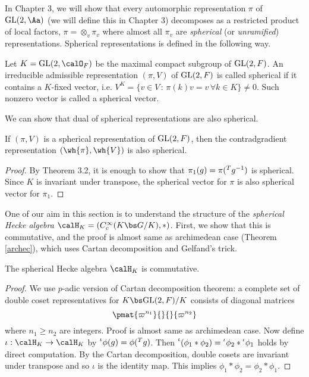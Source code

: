 In Chapter 3, we will show that every automorphic representation $\pi$ of $\GL(2, \Aa)$ (we will define this in Chapter 3) decomposes as a restricted product of local factors, $\pi = \otimes_{v}\pi_v$ where almost all $\pi_v$ are \emph{spherical} (or \emph{unramified}) representations. 
Spherical representations is defined in the following way. 
\begin{definition}
Let $K = \GL(2, \calO_F)$ be the maximal compact subgroup of $\mathrm{GL}(2, F)$. 
An irreducible admissible representation $(\pi, V)$ of $\mathrm{GL}(2, F)$ is called spherical if it contains a $K$-fixed vector, i.e. $V^{K} = \{v\in V\,:\, \pi(k)v = v\,\forall k\in K\}\neq 0$. 
Such nonzero vector is called a spherical vector.  
\end{definition}
We can show that dual of spherical representations are also spherical. 
\begin{proposition}
If $(\pi, V)$ is a spherical representation of $\mathrm{GL}(2, F)$, then the contradgradient representation $(\wh{\pi}, \wh{V})$ is also spherical. 
\end{proposition}
\begin{proof}
By Theorem 3.2, it is enough to show that $\pi_{1}(g) = \pi(\prescript{T}{}{g}^{-1})$ is spherical. Since $K$ is invariant under transpose, the spherical vector for $\pi$ is also spherical vector for $\pi_1$. 
\end{proof}
One of our aim in this section is to understand the structure of the \emph{spherical Hecke algebra} $\calH_{K} = (C_{c}^{\infty}(K\bs G / K), *)$. 
First, we show that this is commutative, and the proof is almost same as archimedean case (Theorem \ref{archec}), which uses Cartan decomposition and Gelfand's trick. 

\begin{theorem}
\label{nonarchsphcom}
The spherical Hecke algebra $\calH_K$ is commutative. 
\end{theorem}
\begin{proof}
We use $p$-adic version of Cartan decomposition theorem: a complete set of double coset representatives for $K\bs \GL(2, F)/K$ consists of diagonal matrices
$$
\pmat{\varpi^{n_1}}{}{}{\varpi^{n_2}}
$$
where $n_1 \geq n_2$ are integers. Proof is almost same as archimedean case. 
Now define $\iota:\calH_K\to \calH_K$ by $\prescript{\iota}{}{\phi}(g) = \phi(\prescript{T}{}{g})$. 
Then $\prescript{\iota}{}{(\phi_1 * \phi_2)} = \prescript{\iota}{}{\phi_2} * \prescript{\iota}{}{\phi_1}$ holds by direct computation. 
By the Cartan decomposition, double cosets are invariant under transpose and so $\iota$ is the identity map. This implies $\phi_1 * \phi_2 = \phi_2 * \phi_1$. 
\end{proof}

